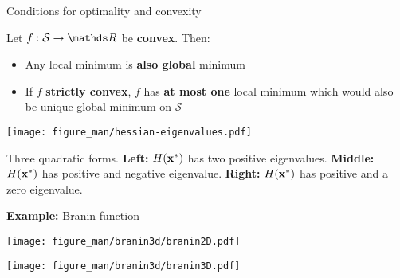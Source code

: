 \documentclass[11pt,compress,t,notes=noshow, xcolor=table]{beamer}
\begin{document}
\begin{vbframe}{Conditions for optimality and convexity}

Let $f:\mathcal{S} \to \R$ be \textbf{convex}.
Then:

\begin{itemize}
    \item Any local minimum is \textbf{also global} minimum
    \item If $f$ \textbf{strictly convex}, $f$ has \textbf{at most one} local minimum which would also be unique global minimum on $\mathcal{S}$
\end{itemize}

\begin{center}
    \texttt{[image: figure\_man/hessian-eigenvalues.pdf]} \\
    \begin{footnotesize}
        Three quadratic forms.
        \textbf{Left:} $H(\mathbf{x}^\ast)$ has two positive eigenvalues.
        \textbf{Middle:} $H(\mathbf{x}^\ast)$ has positive and negative eigenvalue.
        \textbf{Right:} $H(\mathbf{x}^\ast)$ has positive and a zero eigenvalue.
    \end{footnotesize}
\end{center}

\framebreak

\textbf{Example:} Branin function

\vspace{-3\baselineskip}

\begin{center}
    \begin{minipage}[c]{0.4\textwidth}
        \texttt{[image: figure\_man/branin3d/branin2D.pdf]}
    \end{minipage}
    \begin{minipage}[c]{0.4\textwidth}
        \texttt{[image: figure\_man/branin3d/branin3D.pdf]}
    \end{minipage}
\end{center}

\vspace{-3\baselineskip}


\end{vbframe}
\end{document}
